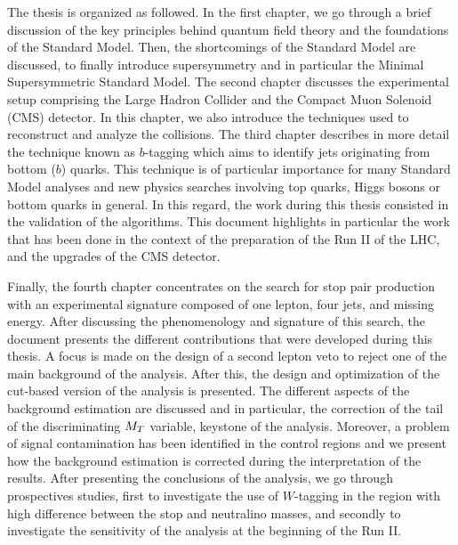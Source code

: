 The thesis is organized as followed. In the first chapter, we go through a brief
discussion of the key principles behind quantum field theory and the foundations of the
Standard Model. Then, the shortcomings of the Standard Model are discussed, to finally
introduce supersymmetry
and in particular the Minimal Supersymmetric Standard Model. The second chapter discusses
the experimental setup comprising the Large Hadron Collider and the Compact Muon Solenoid (CMS)
detector. In this chapter, we also introduce the techniques used to reconstruct and analyze the collisions. The third chapter describes in more detail the technique known
as $b$-tagging which aims to identify jets originating from bottom ($b$) quarks. This technique is
of particular importance for many Standard Model analyses and new physics searches involving top quarks,
Higgs bosons or bottom quarks in general. In this
regard, the work during this thesis consisted in the validation of the algorithms. This document
highlights in particular the work that has been done in the context of the preparation of
the Run II of the LHC, and the upgrades of the CMS detector.

Finally, the fourth chapter concentrates on the search for stop pair production with an
experimental signature composed of one lepton, four jets, and missing energy. After
discussing the phenomenology and signature of this search, the document presents the
different contributions that were developed during this thesis.
A focus is made on the design of a second lepton veto to reject one of the main background
of the analysis. After this, the design and optimization of the cut-based version of the analysis
is presented. The different aspects of the background estimation are
discussed and in particular, the correction of the tail of the discriminating $M_T$
variable, keystone of the analysis.
Moreover, a problem of signal contamination has been identified in the control regions and
we present how the background estimation is corrected during the interpretation of the results.
After presenting the conclusions of the analysis, we go through prospectives studies, first to
investigate the use of $W$-tagging in the region with high difference between the stop and
neutralino masses, and secondly to investigate the sensitivity of the analysis at the beginning
of the Run II.

